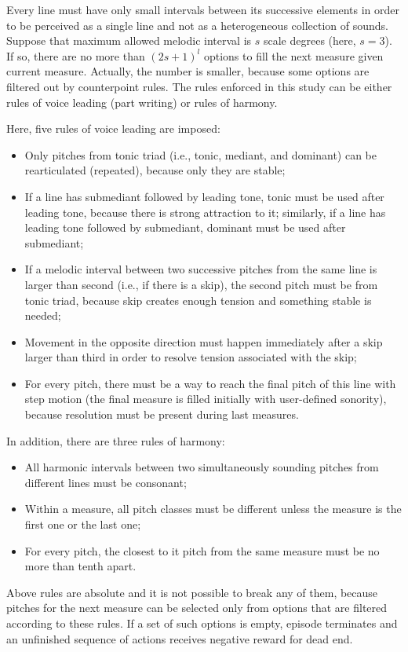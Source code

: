 \documentclass{article}
\begin{document}
Every line must have only small intervals between its successive elements in order to be perceived as a single line and not as a heterogeneous collection of sounds. Suppose that maximum allowed melodic interval is $s$ scale degrees (here, $s = 3$). If so, there are no more than $(2s + 1)^l$ options to fill the next measure given current measure. Actually, the number is smaller, because some options are filtered out by counterpoint rules. The rules enforced in this study can be either rules of voice leading (part writing) or rules of harmony.

Here, five rules of voice leading are imposed:
\begin{itemize}
	\item Only pitches from tonic triad (i.e., tonic, mediant, and dominant) can be rearticulated (repeated), because only they are stable;
	\item If a line has submediant followed by leading tone, tonic must be used after leading tone, because there is strong attraction to it; similarly, if a line has leading tone followed by submediant, dominant must be used after submediant;
	\item If a melodic interval between two successive pitches from the same line is larger than second (i.e., if there is a skip), the second pitch must be from tonic triad, because skip creates enough tension and something stable is needed;
	\item Movement in the opposite direction must happen immediately after a skip larger than third in order to resolve tension associated with the skip;
	\item For every pitch, there must be a way to reach the final pitch of this line with step motion (the final measure is filled initially with user-defined sonority), because resolution must be present during last measures.
\end{itemize}
In addition, there are three rules of harmony:
\begin{itemize}
	\item All harmonic intervals between two simultaneously sounding pitches from different lines must be consonant;
	\item Within a measure, all pitch classes must be different unless the measure is the first one or the last one;
	\item For every pitch, the closest to it pitch from the same measure must be no more than tenth apart.
\end{itemize}

Above rules are absolute and it is not possible to break any of them, because pitches for the next measure can be selected only from options that are filtered according to these rules. If a set of such options is empty, episode terminates and an unfinished sequence of actions receives negative reward for dead end.
\end{document}

